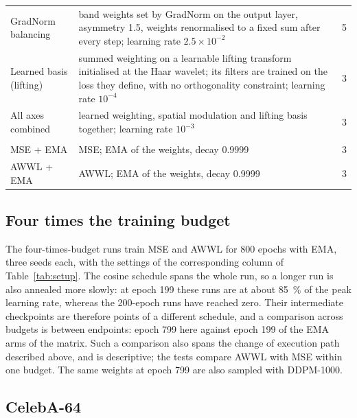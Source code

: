 \begin{table}[tbp]
\begin{tabular}{@{}>{\raggedright\arraybackslash}p{4.6cm}
                >{\raggedright\arraybackslash}p{8.9cm}r@{}}
GradNorm balancing & band weights set by GradNorm \citep{chen2018gradnorm}
  on the output layer, asymmetry 1.5, weights renormalised to a fixed sum
  after every step; learning rate $2.5\times10^{-2}$ & 5 \\
Learned basis (lifting) & summed weighting on a learnable lifting transform
  \citep{sweldens1998lifting} initialised at the Haar wavelet; its filters are
  trained on the loss they define, with no orthogonality constraint; learning
  rate $10^{-4}$ & 3 \\
All axes combined & learned weighting, spatial modulation and lifting basis
  together; learning rate $10^{-3}$ & 3 \\
\addlinespace[2pt]
\multicolumn{3}{@{}l}{\emph{With EMA}} \\
MSE + EMA & MSE; EMA of the weights, decay 0.9999 & 3 \\
AWWL + EMA & AWWL; EMA of the weights, decay 0.9999 & 3 \\
\bottomrule
\end{tabular}
\end{table}

\subsection{Four times the training budget}
\label{app:setup-budget}

The four-times-budget runs train MSE and AWWL for 800 epochs with EMA, three
seeds each, with the settings of the corresponding column of
Table~\ref{tab:setup}. The cosine
schedule spans the whole run, so a longer run is also annealed more slowly: at
epoch 199 these runs are at about \SI{85}{\percent} of the peak learning rate,
whereas the 200-epoch runs have reached zero. Their intermediate checkpoints
are therefore points of a different schedule, and a comparison across budgets
is between endpoints: epoch 799 here against epoch 199 of the EMA arms of the
matrix. Such a comparison also spans the change of execution path described
above, and is descriptive; the tests compare AWWL with MSE within one budget.
The same weights at epoch 799 are also sampled with DDPM-1000.

\subsection{CelebA-64}
\label{app:setup-celeba}

